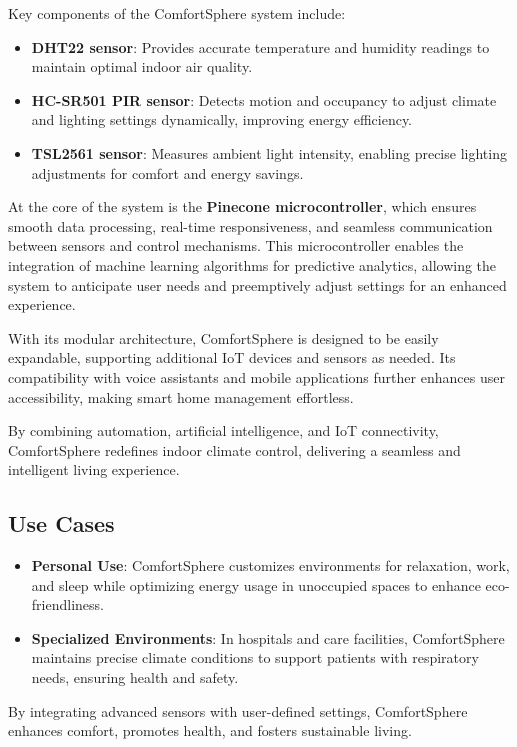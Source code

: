 \documentclass[a4paper]{scrartcl}
\begin{document}
Key components of the ComfortSphere system include:

\begin{itemize}
\item \textbf{DHT22 sensor}: Provides accurate temperature and humidity readings to maintain optimal indoor air quality.
\item \textbf{HC-SR501 PIR sensor}: Detects motion and occupancy to adjust climate and lighting settings dynamically, improving energy efficiency.
\item \textbf{TSL2561 sensor}: Measures ambient light intensity, enabling precise lighting adjustments for comfort and energy savings.
\end{itemize}

At the core of the system is the \textbf{Pinecone microcontroller}, which ensures smooth data processing, real-time responsiveness, and seamless communication between sensors and control mechanisms. This microcontroller enables the integration of machine learning algorithms for predictive analytics, allowing the system to anticipate user needs and preemptively adjust settings for an enhanced experience.

With its modular architecture, ComfortSphere is designed to be easily expandable, supporting additional IoT devices and sensors as needed. Its compatibility with voice assistants and mobile applications further enhances user accessibility, making smart home management effortless.

By combining automation, artificial intelligence, and IoT connectivity, ComfortSphere redefines indoor climate control, delivering a seamless and intelligent living experience.

	\subsection*{Use Cases}
	\begin{itemize}
		\item \textbf{Personal Use}: ComfortSphere customizes environments for relaxation, work, and sleep while optimizing energy usage in unoccupied spaces to enhance eco-friendliness.
		\item \textbf{Specialized Environments}: In hospitals and care facilities, ComfortSphere maintains precise climate conditions to support patients with respiratory needs, ensuring health and safety.
	\end{itemize}

	By integrating advanced sensors with user-defined settings, ComfortSphere enhances comfort, promotes health, and fosters sustainable living.
    
\end{document}
